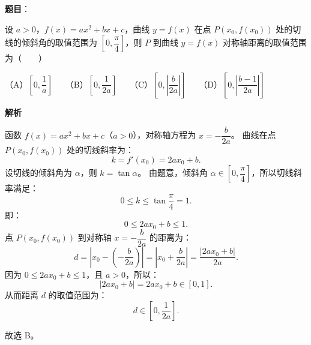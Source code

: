 \begin{answer}

\textbf{题目}：

设 $a > 0$，$f(x) = ax^2 + bx + c$，曲线 $y = f(x)$ 在点 $P(x_0, f(x_0))$ 处的切线的倾斜角的取值范围为 $\left[0, \dfrac{\pi}{4}\right]$，则 $P$ 到曲线 $y = f(x)$ 对称轴距离的取值范围为\mbox{（　　）}

（A）$\left[0, \dfrac{1}{a}\right]$　　（B）$\left[0, \dfrac{1}{2a}\right]$　　（C）$\left[0, \left|\dfrac{b}{2a}\right|\right]$　　（D）$\left[0, \left|\dfrac{b-1}{2a}\right|\right]$

\textbf{解析}

函数 $f(x) = ax^2 + bx + c$（$a > 0$），对称轴方程为 $x = -\dfrac{b}{2a}$。
曲线在点 $P(x_0, f(x_0))$ 处的切线斜率为：
\nopagebreak[4]
\[k = f'(x_0) = 2ax_0 + b.\]
设切线的倾斜角为 $\alpha$，则 $k = \tan\alpha$。
由题意，倾斜角 $\alpha \in \left[0, \dfrac{\pi}{4}\right]$，所以切线斜率满足：
\nopagebreak[4]
\[0 \le k \le \tan\frac{\pi}{4} = 1.\]
即：
\nopagebreak[4]
\[0 \le 2ax_0 + b \le 1.\]
点 $P(x_0, f(x_0))$ 到对称轴 $x = -\dfrac{b}{2a}$ 的距离为：
\nopagebreak[4]
\[d = \left|x_0 - \left(-\frac{b}{2a}\right)\right| = \left|x_0 + \frac{b}{2a}\right| = \frac{|2ax_0 + b|}{2a}.\]
因为 $0 \le 2ax_0 + b \le 1$，且 $a > 0$，所以：
\nopagebreak[4]
\[|2ax_0 + b| = 2ax_0 + b \in [0, 1].\]
从而距离 $d$ 的取值范围为：
\nopagebreak[4]
\[d \in \left[0, \frac{1}{2a}\right].\]

故选 B。


\end{answer}
